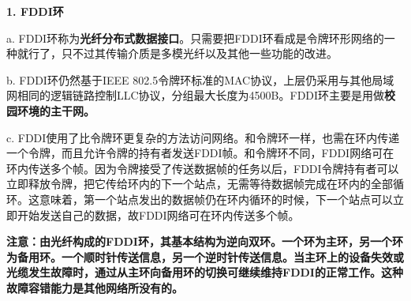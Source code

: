 {\textbf{1. FDDI环}}

a.
FDDI环称为\textbf{光纤分布式数据接口}。只需要把FDDI环看成是令牌环形网络的一种就行了，只不过其传输介质是多模光纤以及其他一些功能的改进。

b. FDDI环仍然基于IEEE
802.5令牌环标准的MAC协议，上层仍采用与其他局域网相同的逻辑链路控制LLC协议，分组最大长度为4500B。FDDI环主要是用做\textbf{校园环境的主干网。}

c.
FDDI使用了比令牌环更复杂的方法访问网络。和令牌环一样，也需在环内传递一个令牌，而且允许令牌的持有者发送FDDI帧。和令牌环不同，FDDI网络可在环内传送多个帧。因为令牌接受了传送数据帧的任务以后，FDDI令牌持有者可以立即释放令牌，把它传给环内的下一个站点，无需等待数据帧完成在环内的全部循环。这意味着，第一个站点发出的数据帧仍在环内循环的时候，下一个站点可以立即开始发送自己的数据，故FDDI网络可在环内传送多个帧。

\textbf{{注意：}由光纤构成的FDDI环，其基本结构为逆向双环。一个环为主环，另一个环为备用环。一个顺时针传送信息，另一个逆时针传送信息。当主环上的设备失效或光缆发生故障时，通过从主环向备用环的切换可继续维持FDDI的正常工作。这种故障容错能力是其他网络所没有的。}
